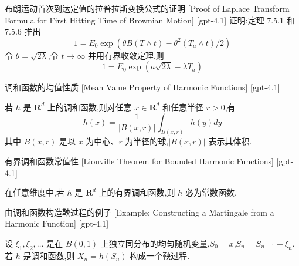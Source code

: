 \documentclass[UTF8]{ctexart}
\begin{document}
    
    
    \begin{prf}
        {布朗运动首次到达定值的拉普拉斯变换公式的证明}
        [Proof of Laplace Transform Formula for First Hitting Time of Brownian Motion]
        [gpt-4.1]
        证明:定理 7.5.1 和 7.5.6 推出
\[
1 = E_{0} \exp(\theta B(T \wedge t) - \theta^{2} (T_{a} \wedge t) / 2)
\]
令 $\theta = \sqrt{2 \lambda}$,令 $t \to \infty$ 并用有界收敛定理,则
\[
1 = E_{0} \exp(a \sqrt{2 \lambda} - \lambda T_{a})
\]

    \end{prf}
    
    
    
    \begin{thm}
        {调和函数的均值性质}
        [Mean Value Property of Harmonic Functions]
        [gpt-4.1]
        
若 $h$ 是 $\mathbf{R}^{d}$ 上的调和函数,则对任意 $x \in \mathbf{R}^{d}$ 和任意半径 $r>0$,有
\[
h(x) = \frac{1}{|B(x, r)|} \int_{B(x, r)} h(y) dy
\]
其中 $B(x, r)$ 是以 $x$ 为中心、$r$ 为半径的球,$|B(x, r)|$ 表示其体积.

    \end{thm}
    
    
    
    \begin{thm}
        {有界调和函数常值性}
        [Liouville Theorem for Bounded Harmonic Functions]
        [gpt-4.1]
        
在任意维度中,若 $h$ 是 $\mathbf{R}^{d}$ 上的有界调和函数,则 $h$ 必为常数函数.

    \end{thm}
    
    
    
    \begin{xmp}
        {由调和函数构造鞅过程的例子}
        [Example: Constructing a Martingale from a Harmonic Function]
        [gpt-4.1]
        
设 $\xi_1, \xi_2, \ldots$ 是在 $B(0,1)$ 上独立同分布的均匀随机变量,$S_0 = x$,$S_n = S_{n-1} + \xi_n$.若 $h$ 是调和函数,则 $X_n = h(S_n)$ 构成一个鞅过程.

    \end{xmp}
    
    
    
\end{document}
